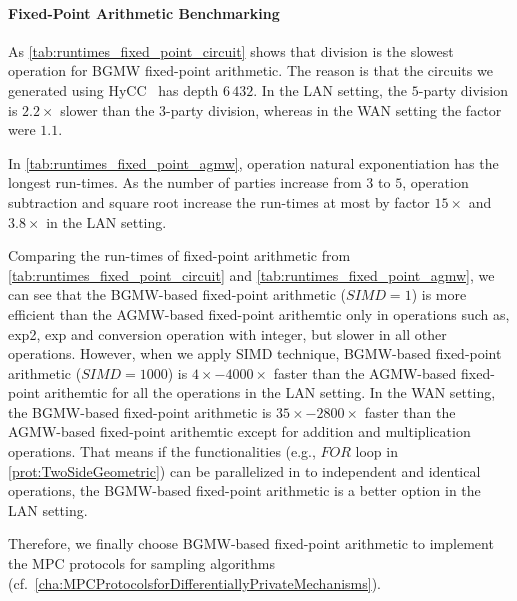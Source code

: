 \paragraph{Fixed-Point Arithmetic Benchmarking}
\label{para:Fixed-PointArithmeticBenchmarking}

As \autoref{tab:runtimes_fixed_point_circuit} shows that division is the slowest operation for BGMW fixed-point arithmetic. The reason is that the circuits we generated using HyCC~\cite{buscher2018hycc} has depth $6\,432$. In the LAN setting, the $5$-party division is $2.2\times $ slower than the $3$-party division, whereas in the WAN setting the factor were $1.1$.

In \autoref{tab:runtimes_fixed_point_agmw}, operation natural exponentiation has the longest run-times. As the number of parties increase from $3$ to $5$, operation subtraction and square root increase the run-times at most by factor $15\times$ and $3.8\times$ in the LAN setting.


Comparing the run-times of fixed-point arithmetic from \autoref{tab:runtimes_fixed_point_circuit} and \autoref{tab:runtimes_fixed_point_agmw}, we can see that the BGMW-based fixed-point arithmetic ($SIMD=1$) is more efficient than the AGMW-based fixed-point arithemtic only in operations such as, exp2, exp and conversion operation with integer, but slower in all other operations.
However, when we apply SIMD technique, BGMW-based fixed-point arithmetic ($SIMD=1000$) is $4\times-4000\times$ faster than the AGMW-based fixed-point arithemtic for all the operations in the LAN setting. In the WAN setting, the BGMW-based fixed-point arithmetic is $35\times-2800\times$ faster than the AGMW-based fixed-point arithemtic except for addition and multiplication operations.
That means if the functionalities (e.g., $FOR$ loop in \autoref{prot:TwoSideGeometric}) can be parallelized in to independent and identical operations, the BGMW-based fixed-point arithmetic is a better option in the LAN setting.

Therefore, we finally choose BGMW-based fixed-point arithmetic to implement the MPC protocols for sampling algorithms (cf.~\autoref{cha:MPCProtocolsforDifferentiallyPrivateMechanisms}).


